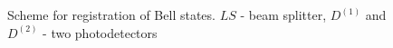 \begin{figure}
\centering


\caption{Scheme for registration of Bell states. $LS$ - beam splitter,
  $D^{(1)}$ and $D^{(2)}$ - two photodetectors}
\label{figBellReg}
\end{figure}